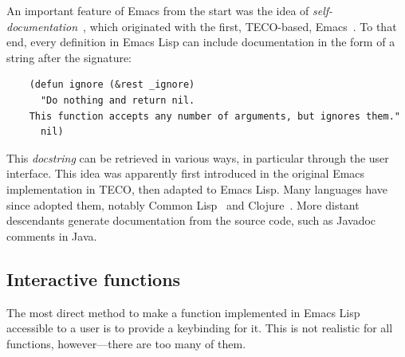 \documentclass[format=acmsmall, review]{acmart}
\newcommand \Elisp {Emacs Lisp}
\begin{document}
An important feature of Emacs from the start was the idea of
\emph{self-documentation}~\cite{Stallman1981}, which originated with
the first, TECO-based, Emacs~\cite{Stallman2018-personal}.  To that end, every
definition in \Elisp{} can include documentation in the form of a
string after the signature:
\begin{verbatim}
    (defun ignore (&rest _ignore)
      "Do nothing and return nil.
    This function accepts any number of arguments, but ignores them."
      nil)
\end{verbatim}
This \emph{docstring} can be retrieved in various ways, in particular
through the user interface.  This idea was apparently first introduced in
the original Emacs implementation in TECO, then adapted to \Elisp{}.
Many languages have since adopted them, notably Common
Lisp~\cite{HyperSpec} and Clojure~\cite{ClojureDotOrg}.  More distant
descendants generate documentation from the source code, such as
Javadoc comments in Java.

\subsection{Interactive functions}
\label{sec:interactive-functions}

The most direct method to make a function implemented in \Elisp{}
accessible to a user is to provide a keybinding for it.  This is not
realistic for all functions, however---there are too many of them.
\end{document}

